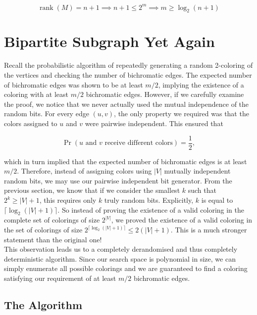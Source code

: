 \[
\operatorname{rank}(M)=n+1
\implies n+1 \leq 2^m 
\implies m \geq \log_2(n+1)
\]


\section{Bipartite Subgraph Yet Again}

Recall the probabilistic algorithm of repeatedly generating a random 2-coloring of the
vertices and checking the number of bichromatic edges. The expected number of bichromatic
edges was shown to be at least $m/2$, implying the existence of a coloring with at least
$m/2$ bichromatic edges. However, if we carefully examine the proof, we notice that we
never actually used the mutual independence of the random bits. For every edge $(u,v)$,
the only property we required was that the colors assigned to $u$ and $v$ were pairwise
independent. This ensured that

\[
\Pr(\text{$u$ and $v$ receive different colors})=\frac12,
\]

which in turn implied that the expected number of bichromatic edges is at least $m/2$. 
Therefore, instead of assigning colors using $|V|$ mutually independent random
bits, we may use our pairwise independent bit generator. From the previous section, we
know that if we consider the smallest $k$ such that $2^k \geq |V|+1$, this 
requires only $k$ truly random bits. Explicitly, $k$ is equal to $\lceil\log_2(|V|+1)\rceil$. 
So instead of proving the existence of a valid coloring in the complete set of colorings of size $2^{|V|}$, 
we proved the existence of a valid coloring in the set of colorings of 
size $2^{\lceil\log_2(|V|+1)\rceil} \le 2(|V|+1)$. This is a much stronger statement than the original one!\\


\noindent This observation leads us to a completely derandomised and thus completely deterministic 
algorithm. Since our search space is polynomial in size, we can simply enumerate all possible colorings and 
we are guaranteed to find a coloring satisfying our requirement of at least $m/2$ bichromatic edges. 

\subsection{The Algorithm}

